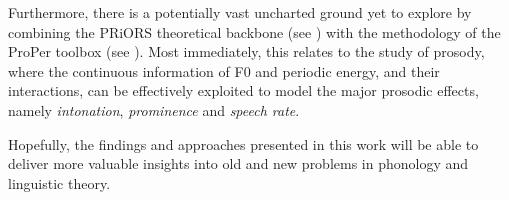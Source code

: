 Furthermore, there is a potentially vast uncharted ground yet to explore by combining the PRiORS theoretical backbone (see ) with the methodology of the ProPer toolbox (see ). Most immediately, this relates to the study of prosody, where the continuous information of F0 and periodic energy, and their interactions, can be effectively exploited to model the  major prosodic effects, namely \emph{intonation}, \emph{prominence} and \emph{speech rate}.


Hopefully, the findings and approaches presented in this work will be able to deliver more valuable insights into old and new problems in phonology and linguistic theory.
